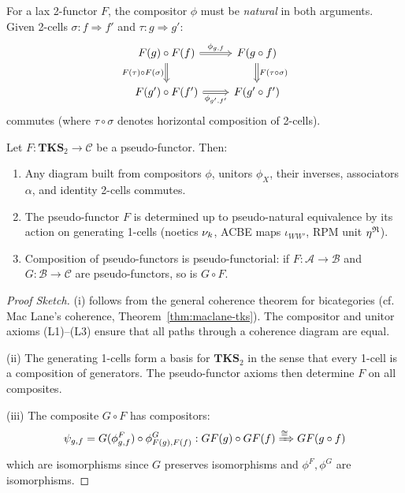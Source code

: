 \begin{definition}
\label{def:compositor-naturality}
For a lax 2-functor $F$, the compositor $\phi$ must be \emph{natural} in both
arguments. Given 2-cells $\sigma : f \Rightarrow f'$ and $\tau : g \Rightarrow g'$:
\[
\begin{tikzcd}
  F(g) \circ F(f)
    \arrow[r, Rightarrow, "\phi_{g,f}"]
    \arrow[d, Rightarrow, "F(\tau) \circ F(\sigma)"']
  &
  F(g \circ f)
    \arrow[d, Rightarrow, "F(\tau \circ \sigma)"]
  \\
  F(g') \circ F(f')
    \arrow[r, Rightarrow, "\phi_{g',f'}"']
  &
  F(g' \circ f')
\end{tikzcd}
\]
commutes (where $\tau \circ \sigma$ denotes horizontal composition of 2-cells).
\end{definition}

\begin{theorem}
\label{thm:tks-pseudo-coherence}
Let $F : \mathbf{TKS}_2 \to \mathcal{C}$ be a pseudo-functor. Then:
\begin{enumerate}[label=(\roman*)]
  \item Any diagram built from compositors $\phi$, unitors $\phi_X$, their inverses,
        associators $\alpha$, and identity 2-cells commutes.
  \item The pseudo-functor $F$ is determined up to pseudo-natural equivalence by
        its action on generating 1-cells (noetics $\nu_{k}$, ACBE maps $\iota_{WW'}$,
        RPM unit $\eta^{\mathfrak{R}}$).
  \item Composition of pseudo-functors is pseudo-functorial: if $F : \mathcal{A} \to \mathcal{B}$
        and $G : \mathcal{B} \to \mathcal{C}$ are pseudo-functors, so is $G \circ F$.
\end{enumerate}
\end{theorem}

\begin{proof}[Proof Sketch]
(i) follows from the general coherence theorem for bicategories (cf. Mac Lane's
coherence, Theorem~\ref{thm:maclane-tks}). The compositor and unitor axioms
(L1)--(L3) ensure that all paths through a coherence diagram are equal.

(ii) The generating 1-cells form a basis for $\mathbf{TKS}_2$ in the sense that
every 1-cell is a composition of generators. The pseudo-functor axioms then
determine $F$ on all composites.

(iii) The composite $G \circ F$ has compositors:
\[
  \psi_{g,f} = G(\phi^F_{g,f}) \circ \phi^G_{F(g), F(f)} :
  GF(g) \circ GF(f) \xRightarrow{\cong} GF(g \circ f)
\]
which are isomorphisms since $G$ preserves isomorphisms and $\phi^F, \phi^G$
are isomorphisms.
\end{proof}

